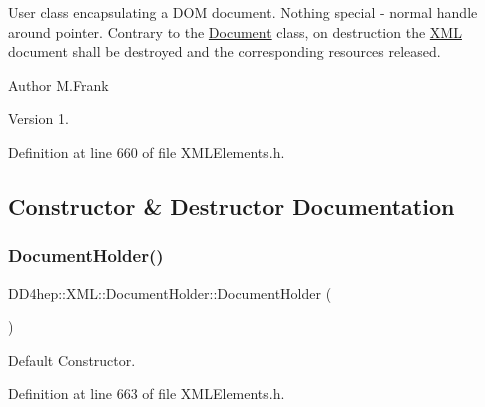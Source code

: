 User class encapsulating a D\+OM document. Nothing special -\/ normal handle around pointer. Contrary to the \hyperlink{class_d_d4hep_1_1_x_m_l_1_1_document}{Document} class, on destruction the \hyperlink{namespace_d_d4hep_1_1_x_m_l}{X\+ML} document shall be destroyed and the corresponding resources released.

\begin{DoxyAuthor}{Author}
M.\+Frank 
\end{DoxyAuthor}
\begin{DoxyVersion}{Version}
1. 
\end{DoxyVersion}


Definition at line 660 of file X\+M\+L\+Elements.\+h.



\subsection{Constructor \& Destructor Documentation}
\hypertarget{class_d_d4hep_1_1_x_m_l_1_1_document_holder_abeb4692ba8b187e1b65921f3f53a0b64}{}\label{class_d_d4hep_1_1_x_m_l_1_1_document_holder_abeb4692ba8b187e1b65921f3f53a0b64} 
\subsubsection{\texorpdfstring{Document\+Holder()}{DocumentHolder()}\hspace{0.1cm}{\footnotesize\ttfamily [1/2]}}
{\footnotesize\ttfamily D\+D4hep\+::\+X\+M\+L\+::\+Document\+Holder\+::\+Document\+Holder (\begin{DoxyParamCaption}{ }\end{DoxyParamCaption})\hspace{0.3cm}{\ttfamily [inline]}}



Default Constructor. 



Definition at line 663 of file X\+M\+L\+Elements.\+h.

\hypertarget{class_d_d4hep_1_1_x_m_l_1_1_document_holder_a8b64dfa073e0343d39b882cb24ce3ffa}{}\label{class_d_d4hep_1_1_x_m_l_1_1_document_holder_a8b64dfa073e0343d39b882cb24ce3ffa} 

